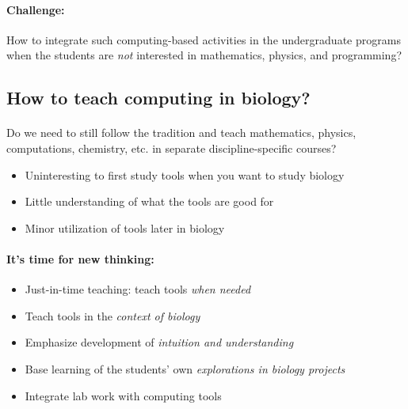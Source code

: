 \documentclass[%
twoside,                 %
final,                   %
10pt]{article}
\begin{document}
\paragraph{Challenge:}
How to integrate such computing-based activities in the undergraduate programs
when the students are \emph{not} interested in mathematics, physics, and
programming?



\subsection*{How to teach computing in biology?}


\paragraph{}
Do we need to still follow the tradition and teach mathematics, physics, computations, chemistry, etc. in separate discipline-specific courses?

\begin{itemize}
  \item Uninteresting to first study tools when you want to study biology

  \item Little understanding of what the tools are good for

  \item Minor utilization of tools later in biology
\end{itemize}

\noindent




\paragraph{It's time for new thinking:}
\begin{itemize}
  \item Just-in-time teaching: teach tools \emph{when needed}

  \item Teach tools in the \emph{context of biology}

  \item Emphasize development of \emph{intuition and understanding}

  \item Base learning of the students' own \emph{explorations in biology projects}

  \item Integrate lab work with computing tools
\end{itemize}
\end{document}
